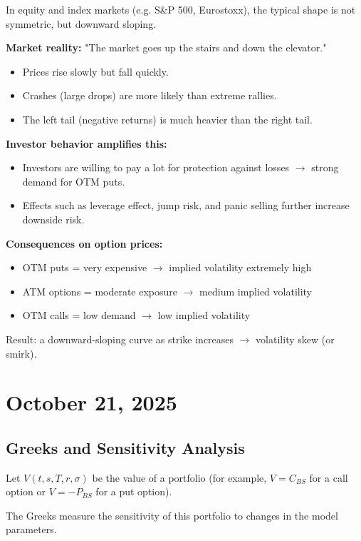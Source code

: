 \documentclass[12pt,a4paper]{article}
\theoremstyle{definition}
\begin{document}
In equity and index markets (e.g. S\&P 500, Eurostoxx), the typical shape is not symmetric, but downward sloping.

\textbf{Market reality:}
"The market goes up the stairs and down the elevator."

\begin{itemize}
\item Prices rise slowly but fall quickly.
\item Crashes (large drops) are more likely than extreme rallies.
\item The left tail (negative returns) is much heavier than the right tail.
\end{itemize}

\textbf{Investor behavior amplifies this:}
\begin{itemize}
\item Investors are willing to pay a lot for protection against losses $\rightarrow$ strong demand for OTM puts.
\item Effects such as leverage effect, jump risk, and panic selling further increase downside risk.
\end{itemize}

\textbf{Consequences on option prices:}
\begin{itemize}
\item OTM puts = very expensive $\rightarrow$ implied volatility extremely high
\item ATM options = moderate exposure $\rightarrow$ medium implied volatility
\item OTM calls = low demand $\rightarrow$ low implied volatility
\end{itemize}

Result: a downward-sloping curve as strike increases $\rightarrow$ volatility skew (or smirk).

\newpage
\section{October 21, 2025}

\subsection{Greeks and Sensitivity Analysis}

Let $V(t, s, T, r, \sigma)$ be the value of a portfolio (for example, $V = C_{BS}$ for a call option or $V = -P_{BS}$ for a put option).

The Greeks measure the sensitivity of this portfolio to changes in the model parameters.
\end{document}

